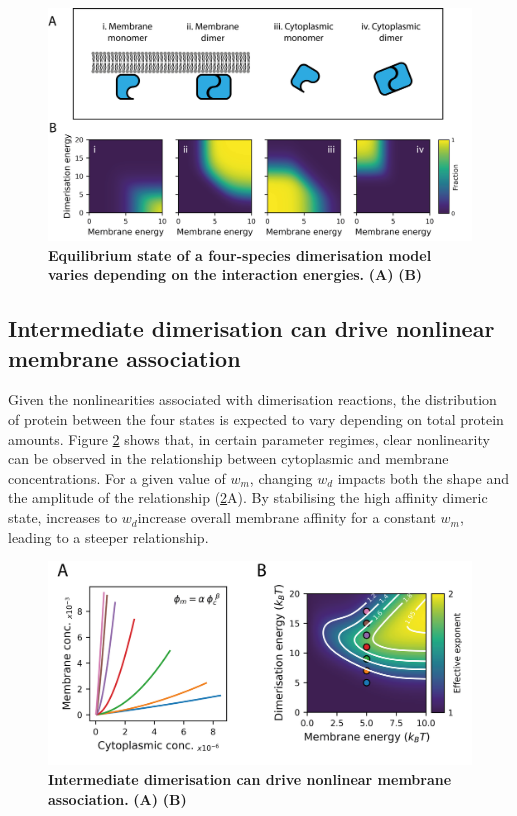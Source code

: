 \documentclass[12pt]{"report"}
\newcommand{\mycaption}[2]{\caption[#1]{\textbf{#1.} #2}}
\begin{document}
\begin{figure}
\includegraphics[scale=0.9]{thermodynamic_model_species}
\centering
\mycaption{Equilibrium state of a four-species dimerisation model varies depending on the interaction energies}{
\textbf{(A)}
\textbf{(B)}
}
\label{fig:thermodynamic_model_species}
\end{figure}


\subsection{Intermediate dimerisation can drive nonlinear membrane association}

Given the nonlinearities associated with dimerisation reactions, the distribution of protein between the four states is expected to vary depending on total protein amounts. Figure \ref{fig:thermodynamic_model_feedback} shows that, in certain parameter regimes, clear nonlinearity can be observed in the relationship between cytoplasmic and membrane concentrations. For a given value of $w_m$, changing $w_d$ impacts both the shape and the amplitude of the relationship (\cref{fig:thermodynamic_model_feedback}A). By stabilising the high affinity dimeric state, increases to $w_d $increase overall membrane affinity for a constant $w_m$, leading to a steeper relationship. \\

\begin{figure}
\includegraphics[scale=1]{thermodynamic_model_feedback}
\centering
\mycaption{Intermediate dimerisation can drive nonlinear membrane association}{
\textbf{(A)}
\textbf{(B)}
}
\label{fig:thermodynamic_model_feedback}
\end{figure}
\end{document}
